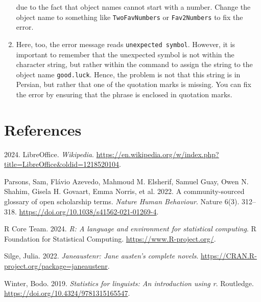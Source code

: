 \documentclass[
  letterpaper,
  DIV=11,
  numbers=noendperiod,
  oneside]{scrreprt}
\newlength{\cslhangindent}
\newenvironment{CSLReferences}[2] %
 {\begin{list}{}{%
  \setlength{\itemindent}{0pt}
  \setlength{\leftmargin}{0pt}
  \setlength{\parsep}{0pt}
  \ifodd #1
   \setlength{\leftmargin}{\cslhangindent}
   \setlength{\itemindent}{-1\cslhangindent}
  \fi
  \setlength{\itemsep}{#2\baselineskip}}}
 {\end{list}}
\begin{document}
\begin{tcolorbox}
\begin{enumerate}
  due to the fact that object names cannot start with a number. Change
  the object name to something like \texttt{TwoFavNumbers} or
  \texttt{Fav2Numbers} to fix the error.
\item
  Here, too, the error message reads \texttt{unexpected\ symbol}.
  However, it is important to remember that the unexpected symbol is not
  within the character string, but rather within the command to assign
  the string to the object name \texttt{good.luck}. Hence, the problem
  is not that this string is in Persian, but rather that one of the
  quotation marks is missing. You can fix the error by ensuring that the
  phrase is enclosed in quotation marks.
\end{enumerate}

\end{tcolorbox}


\chapter*{References}\label{references}


\label{refs}
\begin{CSLReferences}{1}{0}
2024. LibreOffice. \emph{Wikipedia}.
\url{https://en.wikipedia.org/w/index.php?title=LibreOffice&oldid=1218520104}.

Parsons, Sam, Flávio Azevedo, Mahmoud M. Elsherif, Samuel Guay, Owen N.
Shahim, Gisela H. Govaart, Emma Norris, et al. 2022. A community-sourced
glossary of open scholarship terms. \emph{Nature Human Behaviour}.
Nature 6(3). 312--318. \url{https://doi.org/10.1038/s41562-021-01269-4}.

R Core Team. 2024. \emph{R: A language and environment for statistical
computing}. R Foundation for Statistical Computing.
\url{https://www.R-project.org/}.

Silge, Julia. 2022. \emph{Janeaustenr: Jane austen's complete novels}.
\url{https://CRAN.R-project.org/package=janeaustenr}.

Winter, Bodo. 2019. \emph{Statistics for linguists: An introduction
using r}. Routledge. \url{https://doi.org/10.4324/9781315165547}.

\end{CSLReferences}
\end{document}

